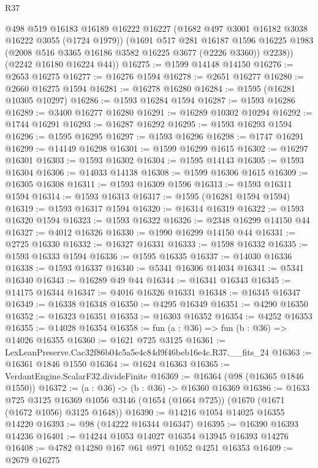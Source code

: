 \begin{lexlean}{R37}
\begin{coremodule}
        @498
        @519
        @16183
        @16189
        @16222
        @16227
        (@1682 @497 @3001 @16182 @3038 @16222 @3055 (@1724 @1979))
        (@1691
          @517
          @281
          @16187
          @1596
          @16225
          @1983
          (@2008 @516 @3365 @16186 @3582 @16225 @3677 (@2226 @3360))
          @2238))
      (@2242 @16180 @16224 @44))
@16275 := @1599 @14148 @14150
@16276 := @2653 @16275
@16277 := @16276 @1594
@16278 := @2651 @16277
@16280 := @2660 @16275 @1594
@16281 := @16278 @16280
@16284 := @1595 (@16281 @10305 @10297)
@16286 := @1593 @16284 @1594
@16287 := @1593 @16286
@16289 := @3400 @16277 @16280
@16291 := @16289 @10302 @10294
@16292 := @1744 @16291
@16293 := @16287 @16292
@16295 := @1593 @16293 @1594
@16296 := @1595 @16295
@16297 := @1593 @16296
@16298 := @1747 @16291
@16299 := @14149 @16298
@16301 := @1599 @16299 @1615
@16302 := @16297 @16301
@16303 := @1593 @16302
@16304 := @1595 @14143
@16305 := @1593 @16304
@16306 := @14033 @14138
@16308 := @1599 @16306 @1615
@16309 := @16305 @16308
@16311 := @1593 @16309 @1596
@16313 := @1593 @16311 @1594
@16314 := @1593 @16313
@16317 := @1595 (@16281 @1594 @1594)
@16319 := @1593 @16317 @1594
@16320 := @16314 @16319
@16322 := @1593 @16320 @1594
@16323 := @1593 @16322
@16326 := @2348 @16299 @14150 @44
@16327 := @4012 @16326
@16330 := @1990 @16299 @14150 @44
@16331 := @2725 @16330
@16332 := @16327 @16331
@16333 := @1598 @16332
@16335 := @1593 @16333 @1594
@16336 := @1595 @16335
@16337 := @14030 @16336
@16338 := @1593 @16337
@16340 := @5341 @16306 @14034
@16341 := @5341 @16340
@16343 := @16289 @49 @44
@16344 := @16341 @16343
@16345 := @14175 @16344
@16347 := @4016 @16326 @16331
@16348 := @16345 @16347
@16349 := @16338 @16348
@16350 := @4295 @16349
@16351 := @4290 @16350
@16352 := @16323 @16351
@16353 := @16303 @16352
@16354 := @4252 @16353
@16355 := @14028 @16354
@16358 := fun (a : @36) => fun (b : @36) => @14026 @16355
@16360 := @1621 @725 @3125
@16361 := LexLeanPreserve.Cac32f86b04c5a5e4c84d9f46beb16e4c.R37.__fits_24
@16363 := @16361 @1846 @1550
@16364 := @1624 @16363
@16365 := VerdantEngine.ScalarF32.divideFinite
@16369 := @16364 (@98 (@16365 @1846 @1550))
@16372 := (a : @36) -> (b : @36) -> @16360 @16369
@16386 := @1633
    @725
    @3125
    @16369
    @1056
    @3146
    (@1654 (@1664 @725))
    (@1670 (@1671 (@1672 @1056) @3125 @1648))
@16390 := @14216 @1054 @14025 @16355 @14220
@16393 := @98 (@14222 @16344 @16347)
@16395 := @16390 @16393 @14236
@16401 := @14244 @1053 @14027 @16354 @13945 @16393 @14276
@16408 := @4782 @14280 @167 @61 @971 @1052 @4251 @16353
@16409 := @2679 @16275

\end{coremodule}
\end{lexlean}
